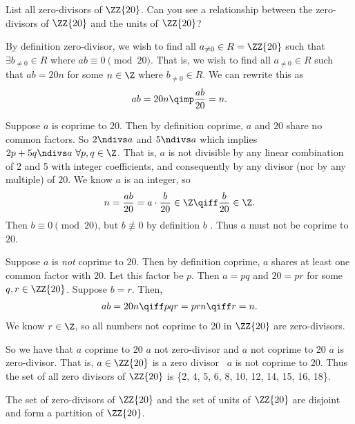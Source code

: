 \documentclass{article}
\begin{document}
List all zero-divisors of \( \ZZ{20} \). Can you see a relationship between the zero-divisors of \( \ZZ{20} \) and the units of \( \ZZ{20} \)?

\begin{solution} %
  By definition zero-divisor, we wish to find all \( a_{\neq 0}\in R = \ZZ{20} \) such that \( \exists b_{\neq 0} \in R \) where \( ab\equiv 0 \pmod{20} \).
  That is, we wish to find all \( a_{\neq 0} \in R \) such that \( ab = 20n \) for some \( n\in\Z \) where \( b_{\neq 0}\in R \).
  We can rewrite this as
  \begin{align*}
    ab = 20n \qimp \frac{ab}{20} = n.
  \end{align*}

  Suppose \( a \) is coprime to \( 20 \). Then by definition coprime, \( a \) and \( 20 \) share no common factors.
  So \( 2\ndivs a \) and \( 5\ndivs a \) which implies \( 2p+5q\ndivs a\ \forall p,q\in\Z \).
  That is, \( a \) is not divisible by any linear combination of 2 and 5 with integer coefficients, and consequently by any divisor (nor by any multiple) of \( 20 \). We know \( a \) is an integer, so \begin{align*}
    n = \frac{ab}{20} = a \cdot \frac{b}{20}\in\Z \qiff \frac{b}{20}\in\Z.
  \end{align*}
  Then \( b \equiv 0\pmod{20} \), but \( b\not\equiv 0 \) by definition \( b \) \contradiction. Thus \( a \) must not be coprime to \( 20 \).

  Suppose \( a \) is \emph{not} coprime to \( 20 \). Then by definition coprime, \( a \) shares at least one common factor with \( 20 \). Let this factor be \( p \). Then \( a = pq \) and \( 20 = pr \) for some \(q,r \in\ZZ{20} \). Suppose \( b = r \). Then, \begin{align*}
    ab = 20n \qiff pqr = prn \qiff r = n.
  \end{align*}
  We know \( r\in\Z \), so all numbers not coprime to 20 in \( \ZZ{20} \) are zero-divisors.

  So we have that \( a \) coprime to 20 \imp \( a \) not zero-divisor and \( a \) not coprime to 20 \imp \( a \) is zero-divisor. That is, \( a\in\ZZ{20} \) is a zero divisor \iff\ \( a \) is not coprime to \( 20 \). Thus the set of all zero divisors of \( \ZZ{20} \) is \{2, 4, 5, 6, 8, 10, 12, 14, 15, 16, 18\}.

  The set of zero-divisors of \( \ZZ{20} \) and the set of units of \( \ZZ{20} \) are disjoint and form a partition of \( \ZZ{20} \).
\end{solution}
\end{document}
